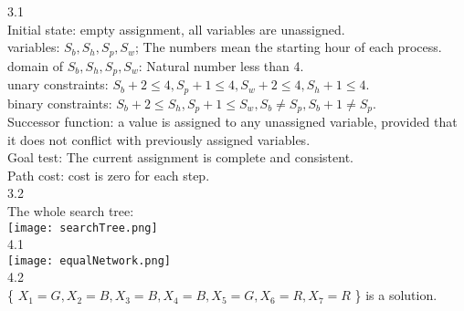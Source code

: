 \documentclass[a4paper]{article}
\begin{document}
3.1\\
Initial state: empty assignment, all variables are unassigned.\\
variables: $ S_b, S_h, S_p, S_w $; The numbers mean the starting hour of each process.
domain of $ S_b, S_h, S_p, S_w $: Natural number less than 4.\\
unary constraints: $S_b + 2 \leqslant 4, S_p + 1 \leqslant 4, S_w + 2 \leqslant 4, S_h + 1 \leqslant 4$.\\
binary constraints: $S_b + 2 \leqslant S_h, S_p + 1 \leqslant S_w, S_b \neq S_p, S_b + 1 \neq S_p $.\\
Successor function: a value is assigned to any unassigned variable, provided that it does not conflict with previously assigned variables.\\
Goal test:  The current assignment is complete and consistent.\\
Path cost: cost is zero for each step.\\

3.2\\
The whole search tree:\\
\texttt{[image: searchTree.png]}\\

4.1\\
\texttt{[image: equalNetwork.png]}\\

4.2\\
\{  $X_1=G, X_2=B, X_3=B, X_4=B, X_5=G, X_6=R, X_7=R$  \} is a solution.\\
\end{document}
